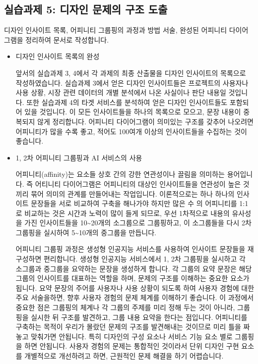 \documentclass[
  letterpaper,
]{book}
\begin{document}
\subsection{실습과제 5: 디자인 문제의 구조
도출}\label{uxc2e4uxc2b5uxacfcuxc81c-5-uxb514uxc790uxc778-uxbb38uxc81cuxc758-uxad6cuxc870-uxb3c4uxcd9c}

디자인 인사이트 목록, 어피니티 그룹핑의 과정과 방법 서술, 완성된
어피니티 다이어그램을 정리하여 문서로 작성합니다.

\begin{itemize}
\item
  디자인 인사이트 목록의 완성

  앞서의 실습과제 3, 4에서 각 과제의 최종 산출물을 디자인 인사이트의
  목록으로 작성하였습니다. 실습과제 3에서 얻은 디자인 인사이트들은
  프로젝트의 사용자나 사용 상황, 시장 관련 데이터의 개별 분석에서 나온
  사실이나 판단 내용일 것입니다. 또한 실습과제 4의 타겟 서비스를
  분석하여 얻은 디자인 인사이트들도 포함되어 있을 것입니다. 이 모든
  인사이트들을 하나의 목록으로 모으고, 문장 내용이 중복되지 않게
  정리합니다. 어피니티 다이어그램이 의미있는 구조를 갖추어 나오려면
  어피니티가 많을 수록 좋고, 적어도 100여개 이상의 인사이트들을 수집하는
  것이 좋습니다.
\item
  1, 2차 어피니티 그룹핑과 AI 서비스의 사용

  어피니티(affinity)는 요소들 상호 간의 강한 연관성이나 끌림을 의미하는
  용어입니다. 즉 어티니티 다이어그램은 어피니티의 대상인 인사이트들을
  연관성이 높은 것끼리 묶어 의미의 관계를 만들어내는 작업입니다.
  이론적으로는 하나 하나의 인사이트 문장들을 서로 비교하여 구축을
  해나가야 하지만 많은 수 의 어피니티를 1:1로 비교하는 것은 시간과
  노력이 많이 들게 되므로, 우선 1차적으로 내용의 유사성을 가진
  인사이트들을 10\textasciitilde20개의 소그룹으로 그룹핑하고, 이
  소그룹들을 다시 2차 그룹핑을 실시하여 5\textasciitilde10개의 중그룹을
  만듭니다.

  어피니티 그룹핑 과정은 생성형 인공지능 서비스를 사용하여 인사이트
  문장들을 재구성하면 편리합니다. 생성형 인공지능 서비스에서 1, 2차
  그룹핑을 실시하고 각 소그룹과 중그룹을 요약하는 문장을 생성하게
  합니다. 각 그룹의 요약 문장은 해당 그룹의 인사이트를 대표하는 역할을
  하며, 문제의 구조를 이해하는 중요한 요소가 됩니다. 요약 문장의 주어를
  사용자나 사용 상황이 되도록 하여 사용자 경험에 대한 주요 서술을하면,
  향후 사용자 경험의 문제 체계를 이해하기 좋습니다. 이 과정에서 중요한
  점은 그룹핑의 체계나 각 그룹의 주제를 미리 정해 두는 것이 아니라,
  그룹핑을 실시한 뒤 구조를 발견하고, 그룹 내용 요약을 한다는 점입니다.
  어피니티를 구축하는 목적이 우리가 몰랐던 문제의 구조를 발견해내는
  것이므로 미리 틀을 짜놓고 맞춰가면 안됩니다. 특히 디자인의 구성 요소나
  서비스 기능 요소 별로 그룹핑을 하면 안됩니다. 사용자 경험의 문제는
  통합적인 것이라서 단위 디자인 구현 요소를 개별적으로 개선하려고 하면,
  근원적인 문제 해결을 하기 어렵습니다.


\end{itemize}
\end{document}
